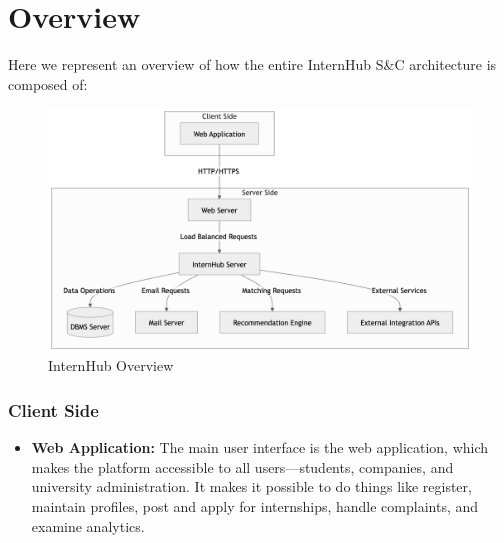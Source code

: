 \section{Overview}
\label{sec:overview}

Here we represent an overview of how the entire InternHub S\&C architecture is composed of:

\begin{figure}[H]
    \begin{center}
        \includegraphics[width=0.82\linewidth]{JhaBhatiaSharma/imagesDD/CKB Overview.png}
        \caption{InternHub Overview}
        \label{fig:internHubOverview}%
    \end{center}
\end{figure}


\subsubsection{Client Side}
\begin{itemize}
    \item \textbf{Web Application:} The main user interface is the web application, which makes the platform accessible to all users—students, companies, and university administration. It makes it possible to do things like register, maintain profiles, post and apply for internships, handle complaints, and examine analytics.
\end{itemize}

